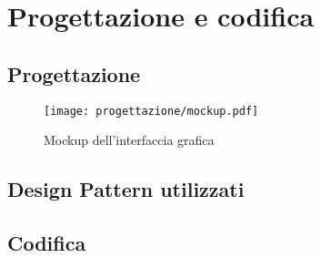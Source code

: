 \chapter{Progettazione e codifica}
\label{cap:progettazione-codifica}


\section{Progettazione}
\label{sec:progettazione}

\begin{figure}[H]
    \centering 
    \texttt{[image: progettazione/mockup.pdf]} 
    \caption{Mockup dell'interfaccia grafica}
\end{figure}

\section{Design Pattern utilizzati}

\section{Codifica}
